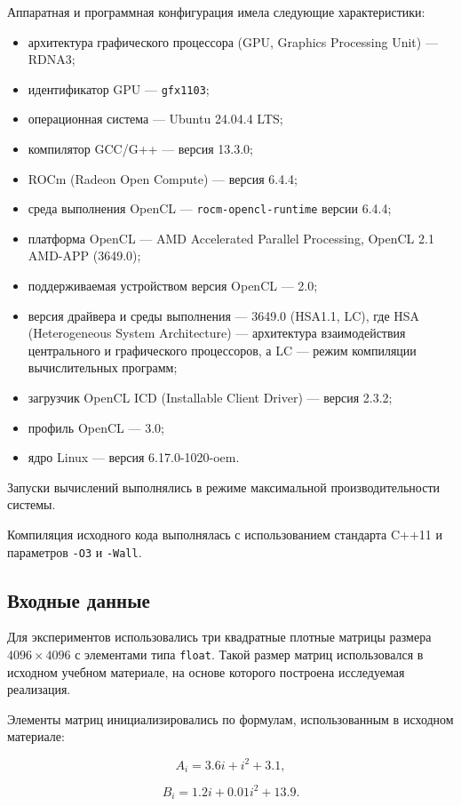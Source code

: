 \documentclass[a4paper]{article}
\begin{document}
Аппаратная и программная конфигурация имела следующие характеристики:
\begin{itemize}
\item архитектура графического процессора (GPU, Graphics Processing Unit) --- RDNA3;
\item идентификатор GPU --- \texttt{gfx1103};
\item операционная система --- Ubuntu 24.04.4 LTS;
\item компилятор GCC/G++ --- версия 13.3.0;
\item ROCm (Radeon Open Compute) --- версия 6.4.4;
\item среда выполнения OpenCL --- \texttt{rocm-opencl-runtime} версии 6.4.4;
\item платформа OpenCL --- AMD Accelerated Parallel Processing, OpenCL 2.1 AMD-APP (3649.0);
\item поддерживаемая устройством версия OpenCL --- 2.0;
\item версия драйвера и среды выполнения --- 3649.0 (HSA1.1, LC), где HSA (Heterogeneous System Architecture) --- архитектура взаимодействия центрального и графического процессоров, а LC --- режим компиляции вычислительных программ;
\item загрузчик OpenCL ICD (Installable Client Driver) --- версия 2.3.2;
\item профиль OpenCL --- 3.0;
\item ядро Linux --- версия 6.17.0-1020-oem.
\end{itemize}

Запуски вычислений выполнялись в режиме максимальной производительности системы.

Компиляция исходного кода выполнялась с использованием стандарта C++11 и параметров \texttt{-O3} и \texttt{-Wall}.

\subsection{Входные данные}

Для экспериментов использовались три квадратные плотные матрицы размера $4096 \times 4096$ с элементами типа \texttt{float}. Такой размер матриц использовался в исходном учебном материале, на основе которого построена исследуемая реализация.

Элементы матриц инициализировались по формулам, использованным в исходном материале:

$$
A_i = 3.6i + i^2 + 3.1,
$$

$$
B_i = 1.2i + 0.01i^2 + 13.9.
$$
\end{document}

